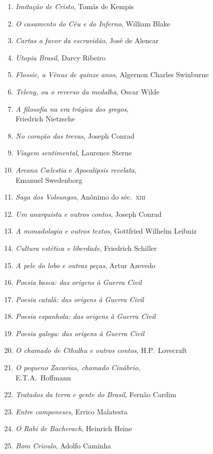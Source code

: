 \begin{enumerate}
\item \textit{Imitação de Cristo}, Tomás de Kempis
\item \textit{O casamento do Céu e do Inferno}, William Blake
\item \textit{Cartas a favor da escravidão}, José de Alencar
\item \textit{Utopia Brasil}, Darcy Ribeiro
\item \textit{Flossie, a Vênus de quinze anos}, Algernon Charles Swinburne
\item \textit{Teleny, ou o reverso da medalha}, Oscar Wilde
\item \textit{A filosofia na era trágica dos gregos},\\ Friedrich Nietzsche
\item \textit{No coração das trevas}, Joseph Conrad
\item \textit{Viagem sentimental}, Laurence Sterne
\item \textit{Arcana C\oe lestia} e \textit{Apocalipsis revelata},\\ Emanuel Swedenborg
\item \textit{Saga dos Volsungos}, Anônimo do séc.~\textsc{xiii}
\item \textit{Um anarquista e outros contos}, Joseph Conrad
\item \textit{A monadologia e outros textos}, Gottfried Wilhelm Leibniz
\item \textit{Cultura estética e liberdade}, Friedrich Schiller
\item \textit{A pele do lobo e outras peças}, Artur Azevedo
\item \textit{Poesia basca: das origens à Guerra Civil} 
\item \textit{Poesia catalã: das origens à Guerra Civil} 
\item \textit{Poesia espanhola: das origens à Guerra Civil} 
\item \textit{Poesia galega: das origens à Guerra Civil} 
\item \textit{O chamado de Cthulhu e outros contos}, H.P.~Lovecraft 
\item \textit{O pequeno Zacarias, chamado Cinábrio},\\ E.T.A.~Hoffmann
\item \textit{Tratados da terra e gente do Brasil}, Fernão Cardim 
\item \textit{Entre camponeses}, Errico Malatesta
\item \textit{O Rabi de Bacherach}, Heinrich Heine
\item \textit{Bom Crioulo}, Adolfo Caminha

\end{enumerate}
